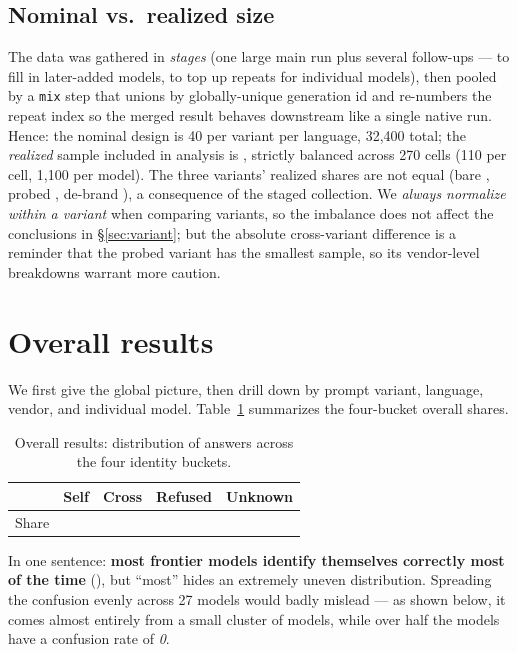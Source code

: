 \documentclass[11pt]{article}
\begin{document}
\subsection{Nominal vs.\ realized size}\label{sec:realized}
The data was gathered in \emph{stages} (one large main run plus several follow-ups --- to
fill in later-added models, to top up repeats for individual models), then pooled by a
\texttt{mix} step that unions by globally-unique generation id and re-numbers the repeat
index so the merged result behaves downstream like a single native run. Hence: the nominal
design is 40 per variant per language, 32{,}400 total; the \emph{realized} sample included
in analysis is \statTotal{}, strictly balanced across 270 cells (110 per cell, 1{,}100 per
model). The three variants' realized shares are not equal (bare \statBareN{},
probed \statProbedN{}, de-brand \statDebrandN{}), a consequence of the staged collection.
We \emph{always normalize within a variant} when comparing variants, so the imbalance does
not affect the conclusions in \S\ref{sec:variant}; but the absolute cross-variant
difference is a reminder that the probed variant has the smallest sample, so its
vendor-level breakdowns warrant more caution.

\section{Overall results}\label{sec:overall}

We first give the global picture, then drill down by prompt variant, language, vendor, and
individual model. Table~\ref{tab:headline} summarizes the four-bucket overall shares.

\begin{table}[H]
\centering
\caption{Overall results: distribution of \statTotal{} answers across the four identity
buckets.}
\label{tab:headline}
\begin{tabular}{lrrrr}
\toprule
& Self & Cross & Refused & Unknown \\
\midrule
Share & \textbf{\pc{\statSelf}} & \pc{\statCross} & \pc{\statRefused} & \pc{\statUnknown} \\
\bottomrule
\end{tabular}
\end{table}

\noindent In one sentence: \textbf{most frontier models identify themselves correctly most
of the time} (\pc{\statSelf}), but ``most'' hides an extremely uneven distribution.
Spreading the \pc{\statCross} confusion evenly across 27 models would badly mislead --- as
shown below, it comes almost entirely from a small cluster of models, while over half the
models have a confusion rate of \emph{0}.
\end{document}
